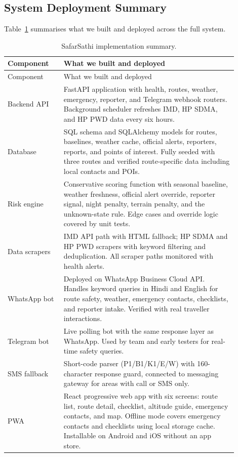 \documentclass[12pt,a4paper]{article}
\begin{document}
\subsection{System Deployment Summary}

Table~\ref{tab:implementation} summarises what we built and deployed across the full system.

\begin{longtable}{p{0.22\linewidth}p{0.68\linewidth}}
  \caption{SafarSathi implementation summary.}
  \label{tab:implementation}\\
  \toprule
  Component & What we built and deployed\\
  \midrule
  \endfirsthead
  \toprule
  Component & What we built and deployed\\
  \midrule
  \endhead
  Backend API & FastAPI application with health, routes, weather, emergency, reporter, and Telegram webhook routers. Background scheduler refreshes IMD, HP SDMA, and HP PWD data every six hours.\\[0.3em]
  Database & SQL schema and SQLAlchemy models for routes, baselines, weather cache, official alerts, reporters, reports, and points of interest. Fully seeded with three routes and verified route-specific data including local contacts and POIs.\\[0.3em]
  Risk engine & Conservative scoring function with seasonal baseline, weather freshness, official alert override, reporter signal, night penalty, terrain penalty, and the unknown-state rule. Edge cases and override logic covered by unit tests.\\[0.3em]
  Data scrapers & IMD API path with HTML fallback; HP SDMA and HP PWD scrapers with keyword filtering and deduplication. All scraper paths monitored with health alerts.\\[0.3em]
  WhatsApp bot & Deployed on WhatsApp Business Cloud API. Handles keyword queries in Hindi and English for route safety, weather, emergency contacts, checklists, and reporter intake. Verified with real traveller interactions.\\[0.3em]
  Telegram bot & Live polling bot with the same response layer as WhatsApp. Used by team and early testers for real-time safety queries.\\[0.3em]
  SMS fallback & Short-code parser (P1/B1/K1/E/W) with 160-character response guard, connected to messaging gateway for areas with call or SMS only.\\[0.3em]
  PWA & React progressive web app with six screens: route list, route detail, checklist, altitude guide, emergency contacts, and map. Offline mode covers emergency contacts and checklists using local storage cache. Installable on Android and iOS without an app store.\\[0.3em]

\end{longtable}
\end{document}
